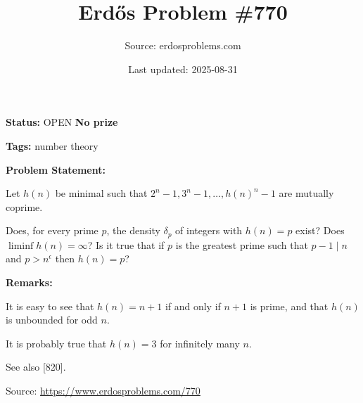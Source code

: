 \documentclass{article}
\title{Erd\H{o}s Problem \#770}
\date{Last updated: 2025-08-31}
\author{Source: erdosproblems.com}
\begin{document}
\maketitle

\noindent\textbf{Status:} OPEN \quad \textbf{No prize}

\noindent\textbf{Tags:} number theory

\medskip
\noindent\textbf{Problem Statement:}

Let $h(n)$ be minimal such that $2^n-1,3^n-1,\ldots,h(n)^n-1$ are mutually coprime. 

Does, for every prime $p$, the density $\delta_p$ of integers with $h(n)=p$ exist? Does $\liminf h(n)=\infty$? Is it true that if $p$ is the greatest prime such that $p-1\mid n$ and $p>n^\epsilon$ then $h(n)=p$?

\bigskip
\noindent\textbf{Remarks:}

It is easy to see that $h(n)=n+1$ if and only if $n+1$ is prime, and that $h(n)$ is unbounded for odd $n$. 

It is probably true that $h(n)=3$ for infinitely many $n$.

See also [820].

\bigskip
\noindent\small{Source: \url{https://www.erdosproblems.com/770}}
\end{document}
